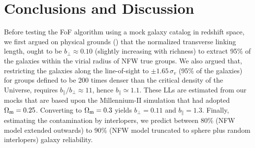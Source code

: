 \section{Conclusions and Discussion}
\label{sec:discussion}

Before testing the FoF algorithm using a mock galaxy catalog in redshift space,
we first argued on physical grounds () that the
normalized transverse linking length, ought to be $b_\perp \approx 0.10$
(slightly increasing with richness) to extract 95\% of the galaxies within the
virial radius of NFW true groups.  We also argued that, restricting the
galaxies along the line-of-sight to $\pm1.65\,\sigma_v$ (95\% of the galaxies)
for groups defined to be 200 times denser than the critical density of the
Universe, requires $b_\parallel/b_\perp \approx 11$, hence $b_\parallel \simeq
1.1$. These LLs are estimated from our mocks that are based upon the
Millennium-II simulation that had adopted $\Omega_{\rm m}=0.25$. Converting to
$\Omega_{\rm m}=0.3$ yields $b_\perp=0.11$ and $b_\parallel=1.3$. Finally,
estimating the contamination by interlopers, we predict between 80\% (NFW model
extended outwards) to 90\% (NFW model truncated to sphere plus random
interlopers) galaxy reliability.
%
